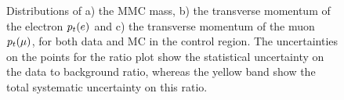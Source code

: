 \begin{figure}[htp]
     \begin{center}


    \end{center}
    \caption{ Distributions  of a) the MMC mass, b) the transverse momentum of the electron $p_{t}(e)$ and c) the transverse momentum of the muon $p_{t}(\mu)$, for both data and MC in the \ttbar control region. The uncertainties on the points for the ratio plot show the statistical uncertainty on the data to background ratio, whereas the yellow band show the total systematic uncertainty on this ratio.} 
   \label{fig:kinematicsttbar}
\end{figure}


